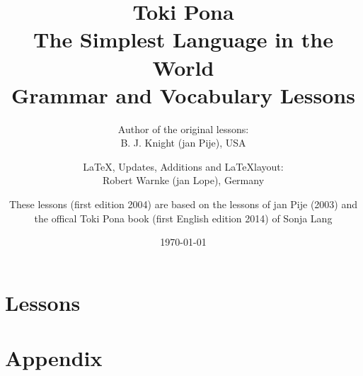 \documentclass[a4paper, 10pt]{book}
\begin{document}
\setlength{\topmargin}{-19mm}
\setlength{\headheight}{5mm}
\setlength{\headsep}{10mm}
\setlength{\textheight}{245mm}
\setlength{\textwidth}{155mm}
\setlength{\oddsidemargin}{5mm}
\setlength{\evensidemargin}{-1mm}
\setlength{\footskip}{20mm}
\setlength{\parindent}{0mm}
\setlength{\parskip}{2.0ex plus 1.0ex minus 0.5ex}

\title{
    Toki Pona \\
    The Simplest Language in the World \\
    Grammar and Vocabulary Lessons \\
}
\author{
    Author of the original lessons: \\ B. J. Knight (jan Pije), USA \cite{www:Pije:01} \\
    \and
    \LaTeX, Updates, Additions and \LaTeX layout: \\ Robert Warnke (jan Lope), Germany \cite{www:rowa:01} \\
    \and
    These lessons (first edition 2004) are based on the lessons of jan Pije (2003) and \\
    the offical Toki Pona book (first English edition 2014) of Sonja Lang \cite{www:tokipona.org}
}

\date
\today
\maketitle
\tableofcontents

\chapter{Lessons}























\appendix
\chapter{Appendix}










\printindex
\end{document}
